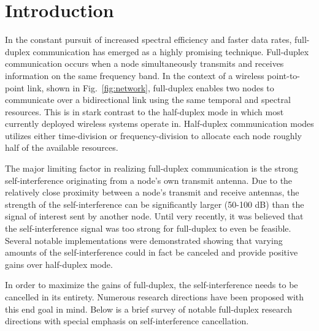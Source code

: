 \documentclass[12pt, journal,draftcls,letterpaper,onecolumn]{IEEEtran}
\begin{document}
\IEEEpeerreviewmaketitle


\section{Introduction}
In the constant pursuit of increased spectral efficiency and faster data rates, full-duplex communication \cite{2010_Melissa_Asilomar,2010_Stanford_Mobicom} has emerged as a highly promising technique.  Full-duplex communication occurs when a node simultaneously transmits and receives information on the same frequency band.  In the context of a wireless point-to-point link, shown in Fig.~\ref{fig:network}, full-duplex enables two nodes to communicate over a bidirectional link using the same temporal and spectral resources.  This is in stark contrast to the half-duplex mode in which most currently deployed wireless systems operate in.  Half-duplex communication modes utilizes either time-division or frequency-division to allocate each node roughly half of the available resources.  

The major limiting factor in realizing full-duplex communication is the strong self-interference originating from a node's own transmit antenna.  Due to the relatively close proximity between a node's transmit and receive antennas, the strength of the self-interference can be significantly larger (50-100 dB) than the signal of interest sent by another node.  Until very recently, it was believed that the self-interference signal was too strong for full-duplex to even be feasible.  Several notable implementations \cite{2011_Evan_Asilomar, 2012_Melissa_TWC, 2011_Stanford_Mobicom} were demonstrated showing that varying amounts of the self-interference could in fact be canceled and provide positive gains over half-duplex mode.
  
In order to maximize the gains of full-duplex, the self-interference needs to be cancelled in its entirety. Numerous research directions have been proposed with this end goal in mind.  Below is a brief survey of notable full-duplex research directions with special emphasis on self-interference cancellation.
\end{document}
